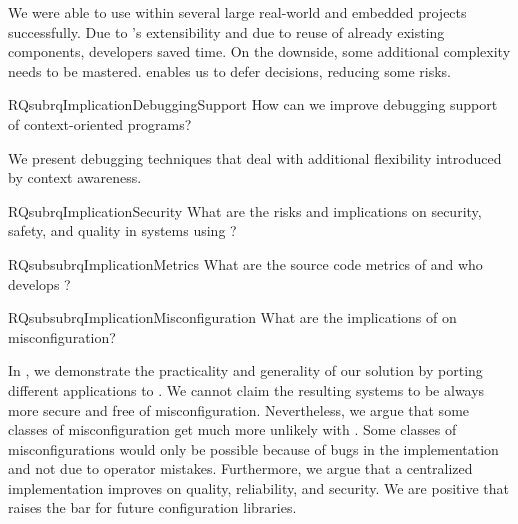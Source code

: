 \begin{contribution}
We were able to use \elektra{} within several large real-world and embedded projects successfully.
Due to \elektra{}'s extensibility and due to reuse of already existing components, developers saved time.
On the downside, some additional complexity needs to be mastered.
 enables us to defer decisions, reducing some risks.
\end{contribution}

\begin{restatable}{RQsub}{rqImplicationDebuggingSupport}
\label{rq:implication-debugging-support}
How can we improve debugging support of context-oriented programs?
\end{restatable}

\begin{contribution}
We present debugging techniques that deal with additional flexibility introduced by context awareness.
\end{contribution}

\begin{restatable}{RQsub}{rqImplicationSecurity}
What are the risks and implications on security, safety, and quality in systems using \elektra{}?%
\label{rq:implication-security}
\end{restatable}

\begin{restatable}{RQsubsub}{rqImplicationMetrics}
What are the source code metrics of \elektra{} and who develops \elektra{}?%
\label{rq:implication-metrics}
\end{restatable}

\begin{restatable}{RQsubsub}{rqImplicationMisconfiguration}
What are the implications of \elektra{} on misconfiguration?%
\label{rq:implication-misconfiguration}
\end{restatable}

\begin{contribution}
In , we demonstrate the practicality and generality of our solution by porting different applications to \elektra{}.
We cannot claim the resulting systems to be always more secure and free of misconfiguration.
Nevertheless, we argue that some classes of misconfiguration get much more unlikely with \elektra{}.
Some classes of misconfigurations would only be possible because of bugs in the implementation and not due to operator mistakes.
Furthermore, we argue that a centralized implementation improves on quality, reliability, and security.
We are positive that \elektra{} raises the bar for future configuration libraries.
\end{contribution}


